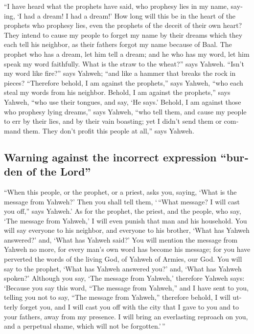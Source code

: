 \begin{paracol}{2}
\begin{otherlanguage}{english}
 ``I have heard what the prophets have said, who prophesy
lies in my name, saying, `I had a dream! I had a dream!' 
How long will this be in the heart of the prophets who prophesy lies,
even the prophets of the deceit of their own heart?  They
intend to cause my people to forget my name by their dreams which they
each tell his neighbor, as their fathers forgot my name because of Baal.
 The prophet who has a dream, let him tell a dream; and
he who has my word, let him speak my word faithfully. What is the straw
to the wheat?'' says Yahweh.  ``Isn't my word like
fire?'' says Yahweh; ``and like a hammer that breaks the rock in pieces?
 ``Therefore behold, I am against the prophets,'' says
Yahweh, ``who each steal my words from his neighbor. 
Behold, I am against the prophets,'' says Yahweh, ``who use their
tongues, and say, `He says.'  Behold, I am against those
who prophesy lying dreams,'' says Yahweh, ``who tell them, and cause my
people to err by their lies, and by their vain boasting; yet I didn't
send them or command them. They don't profit this people at all,'' says
Yahweh.

\hypertarget{warning-against-the-incorrect-expression-burden-of-the-lord}{%
\subsection{Warning against the incorrect expression ``burden of the
Lord''}\label{warning-against-the-incorrect-expression-burden-of-the-lord}}

 ``When this people, or the prophet, or a priest, asks
you, saying, `What is the message from Yahweh?' Then you shall tell
them, `\,``What message? I will cast you off,'' says Yahweh.'
 As for the prophet, the priest, and the people, who say,
`The message from Yahweh,' I will even punish that man and his
household.  You will say everyone to his neighbor, and
everyone to his brother, `What has Yahweh answered?' and, `What has
Yahweh said?'  You will mention the message from Yahweh
no more, for every man's own word has become his message; for you have
perverted the words of the living God, of Yahweh of Armies, our God.
 You will say to the prophet, `What has Yahweh answered
you?' and, `What has Yahweh spoken?'  Although you say,
`The message from Yahweh,' therefore Yahweh says: `Because you say this
word, ``The message from Yahweh,'' and I have sent to you, telling you
not to say, ``The message from Yahweh,''  therefore
behold, I will utterly forget you, and I will cast you off with the city
that I gave to you and to your fathers, away from my presence.
 I will bring an everlasting reproach on you, and a
perpetual shame, which will not be forgotten.'\,''


\end{otherlanguage}
\end{paracol}
